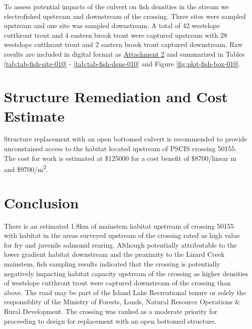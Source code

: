 \documentclass[
]{book}
\begin{document}
To assess potential impacts of the culvert on fish densities in the stream we electrofished upstream and downstream of the crossing. Three sites were sampled upstream and one site was sampled downstream. A total of 42 westslope cutthrout trout and 4 eastern brook trout were captured upstream with 28 westslope cutthrout trout and 2 eastern brook trout captured downstream. Raw results are included in digital format as \href{https://github.com/NewGraphEnvironment/fish_passage_elk_2020_reporting/raw/master/data/habitat_confirmations.xls}{Attachment 2} and summarized in Tables \ref{tab:tab-fish-site-010} - \ref{tab:tab-fish-dens-010} and Figure \ref{fig:plot-fish-box-010}.

\hypertarget{structure-remediation-and-cost-estimate}{%
\section*{Structure Remediation and Cost Estimate}\label{structure-remediation-and-cost-estimate}}

Structure replacement with an open bottomed culvert is recommended to provide unconstained access to the habitat located upstream of PSCIS crossing 50155. The cost for work is estimated at \$125000 for a cost benefit of \$8700/linear m and \$9700/m\textsuperscript{2}.

\hypertarget{conclusion-1}{%
\section*{Conclusion}\label{conclusion-1}}

There is an estimated 1.8km of mainstem habitat upstream of crossing 50155 with habitat in the areas surveyed upstream of the crossing rated as high value for fry and juvenile salmonid rearing. Although potentially attributable to the lower gradient habitat downstream and the proximity to the Lizard Creek mainstem, fish sampling results indicated that the crossing is potentially negatively impacting habitat capacity upstream of the crossing as higher densities of westslope cutthrout trout were captured downstream of the crossing than above. The road may be part of the Island Lake Recreational tenure or solely the responsiblity of the Ministry of Forests, Lands, Natural Resource Operations \& Rural Development. The crossing was ranked as a moderate priority for proceeding to design for replacement with an open bottomed structure.
\end{document}
